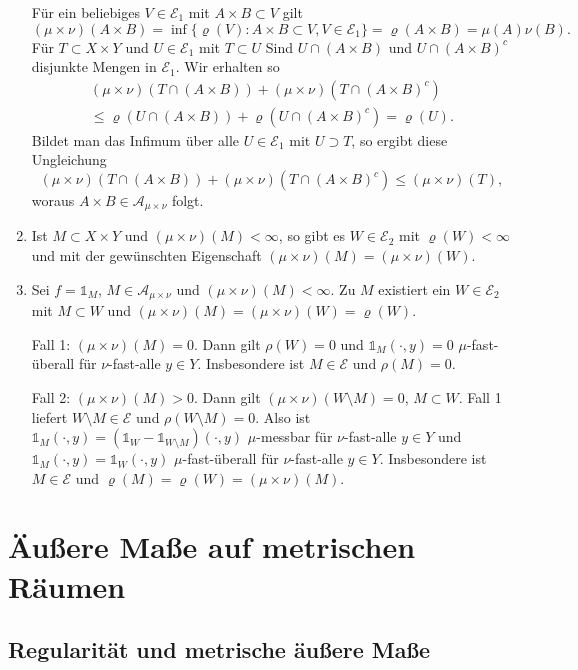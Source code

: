 \documentclass[a4paper,twoside,DIV15,BCOR12mm]{scrbook}
\newcommand{\A}{\mathcal A}
\newcommand{\ind}{\mathds 1}
\begin{document}
\begin{beweis}
\begin{enumerate}
Für ein beliebiges $V\in\mathcal E_1$ mit $A\times B\subset V$ gilt
\[
(\mu\times\nu)(A\times B) =\inf\{\varrho(V):A\times B\subset V,V\in\mathcal{E}_1\}= \varrho(A\times B) = \mu(A) \nu(B).
\]
Für $T\subset X\times Y$ und $U\in \mathcal E_1$ mit $T\subset U$ Sind
$U\cap (A\times B)$ und $U\cap (A\times B)^c$ disjunkte Mengen in $\mathcal E_1$. Wir  erhalten so
\begin{multline*}
(\mu\times \nu) (T\cap (A\times B)) + (\mu\times\nu)(T\cap (A\times B)^c)
\\ \le \varrho(U\cap (A\times B)) + \varrho(U\cap (A\times B)^c) = \varrho(U).
\end{multline*}
Bildet man das Infimum über alle $U\in\mathcal E_1$ mit $U\supset T$, so ergibt diese Ungleichung
\[
(\mu\times \nu) (T\cap (A\times B)) + (\mu\times\nu)(T\cap (A\times B)^c) \le (\mu\times \nu)(T),
\]
woraus $A\times B\in\A_{\mu\times\nu}$ folgt.
\item Ist $M\subset X\times Y$ und $(\mu\times\nu)(M)<\infty$, so gibt es $W\in\mathcal E_2$ mit $\varrho(W)<\infty$ und mit der gewünschten Eigenschaft $(\mu\times\nu)(M) = (\mu\times\nu)(W)$.
\item Sei $f=\ind_M$, $M\in\A_{\mu\times\nu}$ und $(\mu\times\nu)(M)<\infty$. Zu $M$ existiert ein $W\in\mathcal E_2$ mit $M\subset W$ und $(\mu\times\nu)(M) = (\mu\times\nu)(W) =\varrho(W)$.

Fall 1: $(\mu\times\nu)(M) = 0$. Dann gilt $\rho(W)=0$ und $\ind_M(\cdot,y)=0$ $\mu$-fast-überall für $\nu$-fast-alle $y\in Y$. Insbesondere ist $M\in\mathcal E$ und $\rho(M)=0$.

Fall 2: $(\mu\times\nu)(M) > 0$. Dann gilt $(\mu\times\nu)(W\setminus M) = 0$, $M\subset W$. Fall 1 liefert $W\setminus M\in\mathcal E$ und $\rho(W\setminus M)=0$. Also ist $\ind_M(\cdot, y) = (\ind_W - \ind_{W\setminus M})(\cdot,y)$ $\mu$-messbar für $\nu$-fast-alle $y\in Y$ und  $\ind_M(\cdot,y) = \ind_W(\cdot,y)$ $\mu$-fast-überall für $\nu$-fast-alle $y\in Y$. Insbesondere ist $M\in\mathcal E$ und $\varrho(M) = \varrho(W) = (\mu\times\nu)(M)$.
\end{enumerate}
\end{beweis}

\chapter{Äußere Maße auf metrischen Räumen}

\section{Regularität und metrische äußere Maße}
\end{document}
